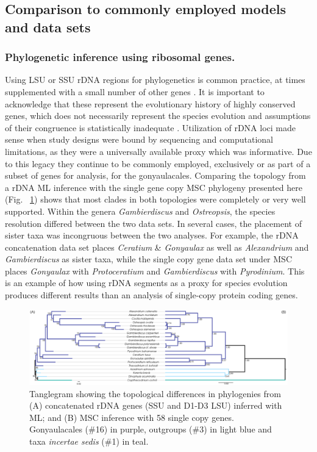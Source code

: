 \documentclass[12pt]{article}
\begin{document}
\subsection{Comparison to commonly employed models and data sets}
\subsubsection{Phylogenetic inference using ribosomal genes.}
\FloatBarrier 
Using LSU or SSU rDNA regions for phylogenetics is common practice, at times supplemented with a small number of other genes \cite{shalchian2006combined,zhang2007three,saldarriaga2004molecular,murray2005improving,hoppenrath2010dinoflagellate}. 
It is important to acknowledge that these represent the evolutionary history of highly conserved genes, which does not necessarily represent the species evolution and assumptions of their congruence is statistically inadequate \cite{degnan2009gene}.
Utilization of rDNA loci made sense when study designs were bound by sequencing and computational limitations, as they were a universally available proxy which was informative. 
Due to this legacy they continue to be commonly employed, exclusively or as part of a subset of genes for analysis, for the gonyaulacales. 
Comparing the topology from a rDNA ML inference with the single gene copy MSC phylogeny presented here (Fig. ~\ref{fig:tanglerDNA}) shows that most clades in both topologies were completely or very well supported. 
Within the genera \emph{Gambierdiscus} and \emph{Ostreopsis}, the species resolution differed between the two data sets. 
In several cases, the placement of sister taxa was incongruous between the two analyses. 
For example, the rDNA concatenation data set places \emph{Ceratium} \& \emph{Gonyaulax} as well as \emph{Alexandrium} and \emph{Gambierdiscus} as sister taxa, while the single copy gene data set under MSC places \emph{Gonyaulax} with \emph{Protoceratium} and \emph{Gambierdiscus} with \emph{Pyrodinium}. 
This is an example of how using rDNA segments as a proxy for species evolution produces different results than an analysis of single-copy protein coding genes.

\begin{figure} 
\includegraphics[scale=.3]{figures/MSC-BI_vs_rDNA-ML.png} 
\caption{Tanglegram showing the topological differences in phylogenies from (A) concatenated rDNA genes (SSU and D1-D3 LSU) inferred with ML; and (B) MSC inference with 58 single copy genes. Gonyaulacales (\#16) in purple, outgroups (\#3) in light blue and taxa \textit{incertae sedis} (\#1) in teal.} 
\label{fig:tanglerDNA}
\end{figure} 
\FloatBarrier
\end{document}
